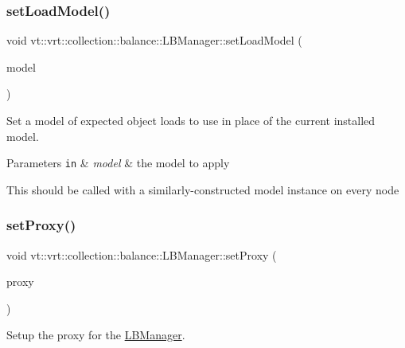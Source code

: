\subsubsection{\texorpdfstring{set\+Load\+Model()}{setLoadModel()}}
{\footnotesize\ttfamily void vt\+::vrt\+::collection\+::balance\+::\+L\+B\+Manager\+::set\+Load\+Model (\begin{DoxyParamCaption}\item[{std\+::shared\+\_\+ptr$<$ \hyperlink{structvt_1_1vrt_1_1collection_1_1balance_1_1_load_model}{Load\+Model} $>$}]{model }\end{DoxyParamCaption})}



Set a model of expected object loads to use in place of the current installed model. 


\begin{DoxyParams}[1]{Parameters}
\mbox{\tt in}  & {\em model} & the model to apply\\
\hline
\end{DoxyParams}
This should be called with a similarly-\/constructed model instance on every node \mbox{\label{structvt_1_1vrt_1_1collection_1_1balance_1_1_l_b_manager_aacef5b639acd9d984b9bcb79ecb9c6a9}} 
\subsubsection{\texorpdfstring{set\+Proxy()}{setProxy()}}
{\footnotesize\ttfamily void vt\+::vrt\+::collection\+::balance\+::\+L\+B\+Manager\+::set\+Proxy (\begin{DoxyParamCaption}\item[{\hyperlink{structvt_1_1objgroup_1_1proxy_1_1_proxy}{objgroup\+::proxy\+::\+Proxy}$<$ \hyperlink{structvt_1_1vrt_1_1collection_1_1balance_1_1_l_b_manager}{L\+B\+Manager} $>$}]{proxy }\end{DoxyParamCaption})\hspace{0.3cm}{\ttfamily [inline]}}



Setup the proxy for the \hyperlink{structvt_1_1vrt_1_1collection_1_1balance_1_1_l_b_manager}{L\+B\+Manager}. 


